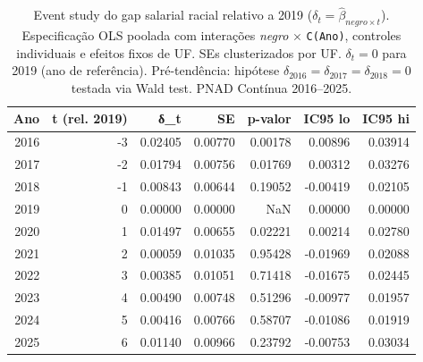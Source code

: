 \begin{table}
\caption{Event study do gap salarial racial relativo a 2019 ($\delta_t = \hat{\beta}_{negro \times t}$). Especificação OLS poolada com interações \textit{negro} $\times$ \texttt{C(Ano)}, controles individuais e efeitos fixos de UF. SEs clusterizados por UF. $\delta_t = 0$ para 2019 (ano de referência). Pré-tendência: hipótese $\delta_{2016}=\delta_{2017}=\delta_{2018}=0$ testada via Wald test. PNAD Contínua 2016--2025.}
\label{tab:event_study_covid}
\begin{tabular}{rrrrrrr}
\toprule
Ano & t (rel. 2019) & δ_t & SE & p-valor & IC95 lo & IC95 hi \\
\midrule
2016 & -3 & 0.02405 & 0.00770 & 0.00178 & 0.00896 & 0.03914 \\
2017 & -2 & 0.01794 & 0.00756 & 0.01769 & 0.00312 & 0.03276 \\
2018 & -1 & 0.00843 & 0.00644 & 0.19052 & -0.00419 & 0.02105 \\
2019 & 0 & 0.00000 & 0.00000 & NaN & 0.00000 & 0.00000 \\
2020 & 1 & 0.01497 & 0.00655 & 0.02221 & 0.00214 & 0.02780 \\
2021 & 2 & 0.00059 & 0.01035 & 0.95428 & -0.01969 & 0.02088 \\
2022 & 3 & 0.00385 & 0.01051 & 0.71418 & -0.01675 & 0.02445 \\
2023 & 4 & 0.00490 & 0.00748 & 0.51296 & -0.00977 & 0.01957 \\
2024 & 5 & 0.00416 & 0.00766 & 0.58707 & -0.01086 & 0.01919 \\
2025 & 6 & 0.01140 & 0.00966 & 0.23792 & -0.00753 & 0.03034 \\
\bottomrule
\end{tabular}
\end{table}
